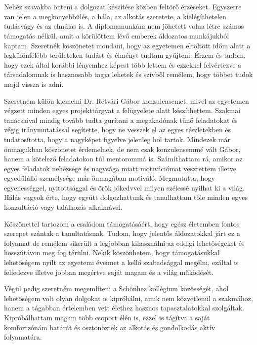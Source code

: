 \chapter*{\koszonetnyilvanitas}



Nehéz szavakba önteni a dolgozat készítése közben feltörő érzéseket.
Egyszerre van jelen a megkönyebbülés, a hála, az alkotás szeretete, a kielégíthetelen tudásvágy és az elmúlás is.
A diplomamunkám nem jöhetett volna létre számos támogatás nélkül, amit a körülöttem lévő emberek áldozatos munkájukból kaptam.
Szeretnék köszönetet mondani, hogy az egyetemen eltöltött időm alatt a legkülönfélébb területeken tudást és élményt tudtam gyűjteni.
Érzem és tudom, hogy ezek által korábbi lényemhez képest több lettem és ezzekkel felvértezve a társadalomnak is hasznosabb tagja lehetek és szívből remélem, hogy többet tudok majd vissza is adni.

Szeretném külön kiemelni Dr. Rétvári Gábor konzulensemet, mivel az egyetemen végzett minden egyes projekttárgyat a felügyelete alatt készíthettem.
Szakmai tanácsaival mindig tovább tudta gurítani a megakadónak tűnő feladatokat és végig iránymutatással segítette, hogy ne vesszek el az egyes részletekben és tudatosította, hogy a nagyképet figyelve jelenleg hol tartok.
Mindezek már önmagukban köszönetet érdemelnek, de nem csak konzulensemmé vált Gábor, hanem a kötelező feladatokon túl mentorommá is.
Számíthattam rá, amikor az egyes feladatok nehézsége és nagysága miatt motivációmat vesztettem illetve egyedülálló személysége már önmagában motiváló.
Megmutatta, hogy egyenességgel, nyitottsággal és örök jókedvvel milyen szélessé nyilhat ki a világ.
Hálás vagyok érte, hogy együtt dolgozhattunk és tanulhattam tőle minden egyes konzultáció vagy találkozás alkalmával.

Köszönettel tartozom a családom támogatásáért, hogy egész életemben fontos szerepet szántak a tanultatásnak.
Tudom, hogy jelentős áldozatokkal járt ez a folyamat de remélem sikerült a legjobban kihasználni az eddigi lehetőségeket és hosszútávon meg fog térülni.
Nekik köszönhetem, hogy támogatásukkal lehetőségem nyílt az egyetemi éveimet a kellő szabadsággal megélni, ezáltal is felfedezve illetve jobban megértve saját magam és a világ működését.

Végül pedig szeretném megemlíteni a Schönhez kollégium közösségét, ahol lehetőségem volt olyan dolgokat is kipróbálni, amik nem  közvetlenül a szakmához, hanem a tágabban értelemben vett élethez hasznos tapasztalatokkal szolgáltak.
Kipróbálhattam magam több csoport élén is, ezzel is tágítva a saját komfortzónám határát és ösztönöztek az alkotás és gondolkodás aktív folyamatára.